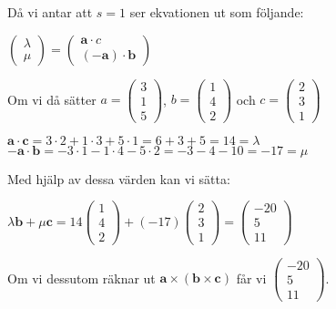 Då vi antar att $s=1$ ser ekvationen ut som följande:
\begin{center}
    $\begin{pmatrix}\lambda\\\mu\end{pmatrix}=\begin{pmatrix}\bm{a}\cdot c\\ (-\bm{a})\cdot \bm{b}\end{pmatrix}$
\end{center}
Om vi då sätter
$a=\begin{pmatrix}3\\1\\5\end{pmatrix}$, $b=\begin{pmatrix}1\\4\\2\end{pmatrix}$ och $c=\begin{pmatrix}2\\3\\1\end{pmatrix}$\\
\begin{center}
    $\bm{a}\cdot \bm{c} = 3\cdot 2 + 1\cdot 3 + 5\cdot 1 = 6 + 3 + 5 = 14 = \lambda$\\
    $-\bm{a}\cdot \bm{b} = -3\cdot 1 - 1\cdot 4 - 5\cdot 2 = -3 -4 -10 = -17 = \mu$
\end{center}
Med hjälp av dessa värden kan vi sätta:
\begin{center}
    $\lambda \bm{b} + \mu \bm{c} = 
    14\begin{pmatrix}1\\4\\2\end{pmatrix} + (-17)\begin{pmatrix}2\\3\\1\end{pmatrix} =
    \begin{pmatrix}-20\\5\\11\end{pmatrix}$
\end{center}
Om vi dessutom räknar ut $\bm{a}\times(\bm{b}\times\bm{c})$ får vi $\begin{pmatrix}-20\\5\\11\end{pmatrix}$.